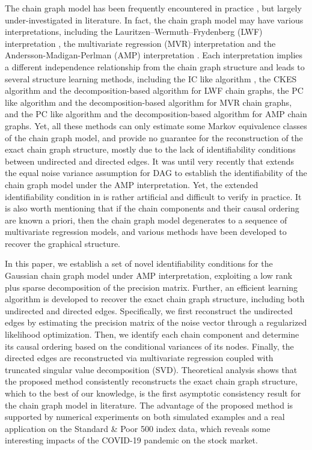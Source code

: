 \documentclass[12pt]{article}
\newcommand{\1}{\uppercase\expandafter{\romannumeral1}}
\newcommand{\2}{\uppercase\expandafter{\romannumeral2}}
\newcommand{\0}{\textbf{0}}
\begin{document}
The chain graph model has been frequently encountered in practice \cite{Chen2018, Ha2021}, but largely under-investigated in literature. In fact, the chain graph model may have various interpretations, including the Lauritzen–Wermuth–Frydenberg (LWF) interpretation \cite{Lauritzen1989, Frydenberg1990}, the multivariate regression (MVR) interpretation \cite{Cox1993} and  the Andersson-Madigan-Perlman (AMP) interpretation \cite{Andersson2001}. Each interpretation implies a different independence relationship from the chain graph structure and leads to several structure learning methods, including the IC like algorithm \cite{Studeny1997}, the CKES algorithm \cite{Pena2014} and the decomposition-based algorithm \cite{Ma2008}  for LWF chain graphs, the PC like algorithm \cite{Sonntag2012} and the decomposition-based algorithm \cite{Javidian2018} for MVR chain graphs, and the PC like algorithm \cite{Pena20142} and the decomposition-based algorithm \cite{Javidian2020} for AMP chain graphs. Yet, all these methods can only estimate some Markov equivalence classes of the chain graph model, and provide no guarantee for the reconstruction of the exact chain graph structure, mostly due to the lack of identifiability conditions between undirected and directed edges. It was until very recently that \cite{Wang2021} extends the equal noise variance assumption for DAG \cite{Peters2014} to establish the identifiability of the chain graph model under the AMP interpretation. Yet, the extended identifiability condition in \cite{Wang2021} is rather artificial and difficult to verify in practice. It is also worth mentioning that if the chain components and their causal ordering are known a priori, then the chain graph model degenerates to a sequence of multivariate regression models, and various methods \cite{Drton2006, Mccarter2014, Ha2021} have been developed to recover the graphical structure.

In this paper, we establish a set of novel identifiability conditions for the Gaussian chain graph model under AMP interpretation, exploiting a low rank plus sparse decomposition of the precision matrix. Further, an efficient learning algorithm is developed to recover the exact chain graph structure, including both undirected and directed edges. Specifically, we first reconstruct the undirected edges by estimating the precision matrix of the noise vector through a regularized likelihood optimization.  Then, we identify each chain component and determine its causal ordering based on the conditional variances of its nodes. Finally, the directed edges are reconstructed via multivariate regression coupled with truncated singular value decomposition (SVD). Theoretical analysis shows that the proposed method consistently reconstructs the exact chain graph structure, which to the best of our knowledge, is the first asymptotic consistency result for the chain graph model in literature. The advantage of the proposed method is supported by numerical experiments on both simulated examples and a real application on the Standard \& Poor 500 index data, which reveals some interesting impacts of the COVID-19 pandemic on the stock market.
\end{document}
